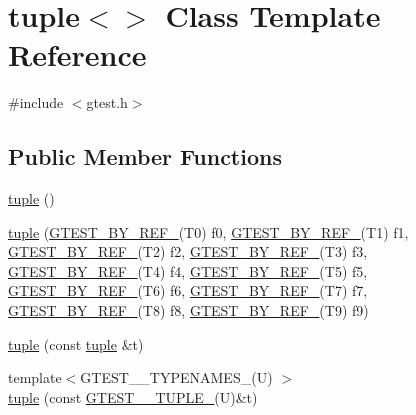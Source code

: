 \hypertarget{classstd_1_1tr1_1_1tuple}{\section{tuple$<$$>$ \-Class \-Template \-Reference}
\label{d7/d6d/classstd_1_1tr1_1_1tuple}
}


{\ttfamily \#include $<$gtest.\-h$>$}

\subsection*{\-Public \-Member \-Functions}
\begin{DoxyCompactItemize}
\item 
\hyperlink{classstd_1_1tr1_1_1tuple_a530b48c0bc4312965b1aebb57f400e21}{tuple} ()
\item 
\hyperlink{classstd_1_1tr1_1_1tuple_ac9d924f232762cf4e8072ad05f1a1c73}{tuple} (\hyperlink{namespacestd_1_1tr1_a70eef1687deb32579a7162328afc3778}{\-G\-T\-E\-S\-T\-\_\-\-B\-Y\-\_\-\-R\-E\-F\-\_\-}(\-T0) f0, \hyperlink{namespacestd_1_1tr1_a70eef1687deb32579a7162328afc3778}{\-G\-T\-E\-S\-T\-\_\-\-B\-Y\-\_\-\-R\-E\-F\-\_\-}(\-T1) f1, \hyperlink{namespacestd_1_1tr1_a70eef1687deb32579a7162328afc3778}{\-G\-T\-E\-S\-T\-\_\-\-B\-Y\-\_\-\-R\-E\-F\-\_\-}(\-T2) f2, \hyperlink{namespacestd_1_1tr1_a70eef1687deb32579a7162328afc3778}{\-G\-T\-E\-S\-T\-\_\-\-B\-Y\-\_\-\-R\-E\-F\-\_\-}(\-T3) f3, \hyperlink{namespacestd_1_1tr1_a70eef1687deb32579a7162328afc3778}{\-G\-T\-E\-S\-T\-\_\-\-B\-Y\-\_\-\-R\-E\-F\-\_\-}(\-T4) f4, \hyperlink{namespacestd_1_1tr1_a70eef1687deb32579a7162328afc3778}{\-G\-T\-E\-S\-T\-\_\-\-B\-Y\-\_\-\-R\-E\-F\-\_\-}(\-T5) f5, \hyperlink{namespacestd_1_1tr1_a70eef1687deb32579a7162328afc3778}{\-G\-T\-E\-S\-T\-\_\-\-B\-Y\-\_\-\-R\-E\-F\-\_\-}(\-T6) f6, \hyperlink{namespacestd_1_1tr1_a70eef1687deb32579a7162328afc3778}{\-G\-T\-E\-S\-T\-\_\-\-B\-Y\-\_\-\-R\-E\-F\-\_\-}(\-T7) f7, \hyperlink{namespacestd_1_1tr1_a70eef1687deb32579a7162328afc3778}{\-G\-T\-E\-S\-T\-\_\-\-B\-Y\-\_\-\-R\-E\-F\-\_\-}(\-T8) f8, \hyperlink{namespacestd_1_1tr1_a70eef1687deb32579a7162328afc3778}{\-G\-T\-E\-S\-T\-\_\-\-B\-Y\-\_\-\-R\-E\-F\-\_\-}(\-T9) f9)
\item 
\hyperlink{classstd_1_1tr1_1_1tuple_a2b1ef21f7b6de5373fcdcaba52f04edb}{tuple} (const \hyperlink{classstd_1_1tr1_1_1tuple}{tuple} \&t)
\item 
{\footnotesize template$<$\-G\-T\-E\-S\-T\-\_\-\_\-\-T\-Y\-P\-E\-N\-A\-M\-E\-S\-\_\-(\-U) $>$ }\\\hyperlink{classstd_1_1tr1_1_1tuple_a1c73ccfe8ca9a044581d95ea0f558ffe}{tuple} (const \hyperlink{gtest-tuple_8h_a275e7bcd84299cc44b9c1dba971951c4}{\-G\-T\-E\-S\-T\-\_\-\_\-\-T\-U\-P\-L\-E\-\_\-}(\-U)\&t)

\end{DoxyCompactItemize}
